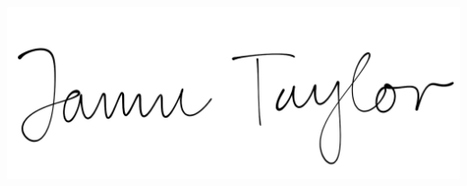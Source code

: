 \documentclass[10pt,a4paper]{letter}
\begin{document}
\begin{spacing}{1.30}
{{				
				\vspace{0ex}
				
				\begin{flushright}
					\begin{minipage}{0.3\linewidth}
						\includegraphics[width=\linewidth]{signature}\\[-3ex]
					\end{minipage}
		\end{flushright}}}
		
	\end{spacing}
\end{document}
